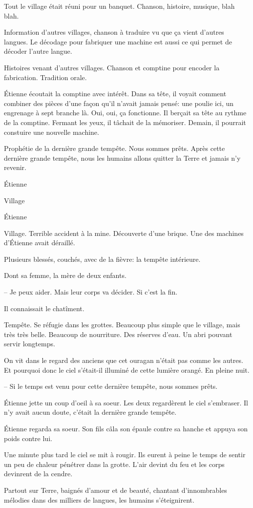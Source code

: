 Tout le village était réuni pour un banquet. Chanson, histoire, musique, blah blah.

Information d'autres villages, chanson à traduire vu que ça vient d'autres langues.
Le décodage pour fabriquer une machine est aussi ce qui permet de décoder l'autre langue.

Histoires venant d'autres villages. Chanson et comptine pour encoder la fabrication. 
Tradition orale.

Étienne écoutait la comptine avec intérêt. Dans sa tête, il voyait comment combiner des pièces d'une
façon qu'il n'avait jamais pensé: une poulie ici, un engrenage à sept branche là. Oui, oui, ça fonctionne.
Il berçait sa tête au rythme de la comptine. Fermant les yeux, il tâchait de la mémoriser.
Demain, il pourrait constuire une nouvelle machine.

Prophétie de la dernière grande tempête. Nous sommes prêts.
Après cette dernière grande tempête, nous les humains allons quitter la Terre et jamais n'y revenir.

\sautSection{}

Étienne 

\sautSection{}

Village 

\sautSection{}

Étienne

\sautSection{}

Village. Terrible accident à la mine. Découverte d'une brique.
Une des machines d'Étienne avait déraillé.

Plusieurs blessés, couchés, avec de la fièvre: la tempête intérieure.

Dont sa femme, la mère de deux enfants.

-- Je peux aider. Mais leur corps va décider. Si c'est la fin.


Il connaissait le chatîment.

\sautSection{}

Tempête. Se réfugie dans les grottes. Beaucoup plus simple que le village, mais très très belle.
Beaucoup de nourriture. Des réserves d'eau. Un abri pouvant servir longtemps.


On vit dans le regard des anciens que cet ouragan n'était pas comme les autres.
Et pourquoi donc le ciel s'était-il illuminé de cette lumière orangé. En pleine nuit.

-- Si le temps est venu pour cette dernière tempête, nous sommes prêts.

Étienne jette un coup d'oeil à sa soeur. Les deux regardèrent le ciel s'embraser.
Il n'y avait aucun doute, c'était la dernière grande tempête.

Étienne regarda sa soeur. Son fils câla son épaule contre sa hanche et appuya son poids contre lui.

Une minute plus tard le ciel se mit à rougir.  
%
Ils eurent à peine le temps de
sentir un peu de chaleur pénétrer dans la grotte. 
%
L'air devint du feu et les
corps devinrent de la cendre.

Partout sur Terre, baignés d'amour et de beauté, chantant d'innombrables mélodies dans des milliers de langues,
les humains s'éteignirent.


